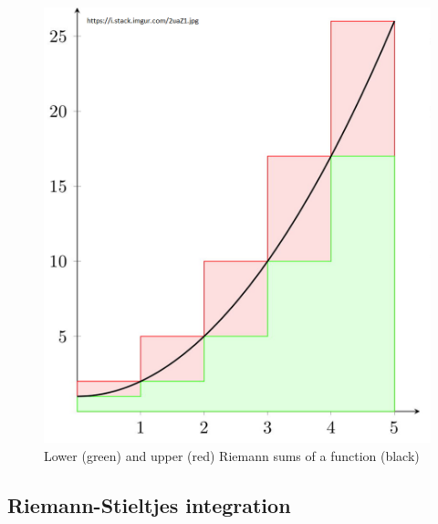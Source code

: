 \documentclass[12pt]{article}
\begin{document}
\begin{figure}[h!]
	\centering
	\includegraphics[width=0.8\linewidth]{riemannSums.png}
	\caption{Lower (green) and upper (red) Riemann sums of a function (black)}
	\label{fig:riemannSums}
\end{figure}

\subsection{Riemann-Stieltjes integration}
\end{document}
